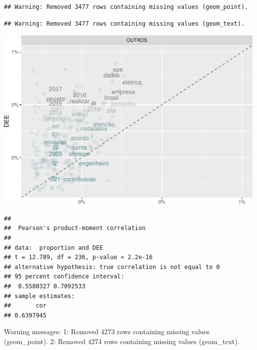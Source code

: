 \documentclass[]{article}
\newenvironment{Shaded}{\begin{snugshade}}{\end{snugshade}}
\newcommand{\KeywordTok}[1]{\textcolor[rgb]{0.13,0.29,0.53}{\textbf{#1}}}
\newcommand{\DataTypeTok}[1]{\textcolor[rgb]{0.13,0.29,0.53}{#1}}
\newcommand{\StringTok}[1]{\textcolor[rgb]{0.31,0.60,0.02}{#1}}
\newcommand{\FunctionTok}[1]{\textcolor[rgb]{0.00,0.00,0.00}{#1}}
\newcommand{\OperatorTok}[1]{\textcolor[rgb]{0.81,0.36,0.00}{\textbf{#1}}}
\newcommand{\AttributeTok}[1]{\textcolor[rgb]{0.77,0.63,0.00}{#1}}
\newcommand{\NormalTok}[1]{#1}
\begin{document}
\begin{verbatim}
## Warning: Removed 3477 rows containing missing values (geom_point).
\end{verbatim}

\begin{verbatim}
## Warning: Removed 3477 rows containing missing values (geom_text).
\end{verbatim}

\includegraphics{markdown_v31_files/figure-latex/unnamed-chunk-59-1.pdf}

\begin{Shaded}
\end{Shaded}

\begin{verbatim}
## 
##  Pearson's product-moment correlation
## 
## data:  proportion and DEE
## t = 12.789, df = 236, p-value < 2.2e-16
## alternative hypothesis: true correlation is not equal to 0
## 95 percent confidence interval:
##  0.5580327 0.7092533
## sample estimates:
##       cor 
## 0.6397945
\end{verbatim}

\begin{Shaded}
\begin{Highlighting}[]
\FunctionTok{Warning messages:}
\FunctionTok{1:}\AttributeTok{ Removed 4273 rows containing missing values (geom_point). }
\FunctionTok{2:}\AttributeTok{ Removed 4274 rows containing missing values (geom_text).}
\end{Highlighting}
\end{Shaded}
\end{document}
